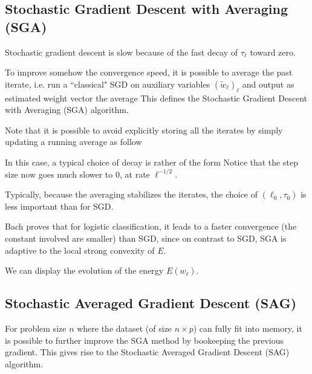 


\subsection{Stochastic Gradient Descent with Averaging (SGA)}

Stochastic gradient descent is slow because of the fast decay of
$\tau_\ell$ toward zero.

To improve somehow the convergence speed, it is possible to average the past
iterate, i.e. run a ``classical" SGD on auxiliary variables $ (\tilde w_\ell)_\ell$
and output as estimated weight vector the average
This defines the Stochastic Gradient Descent with Averaging (SGA)
algorithm.


Note that it is possible to avoid explicitly storing all the iterates by simply
updating a running average as follow


In this case, a typical choice of decay is rather of the form 
Notice that the step size now goes much slower to 0, at rate $\ell^{-1/2}$.


Typically, because the averaging stabilizes the iterates, the choice of
$(\ell_0,\tau_0)$ is less important than for SGD. 


Bach proves that for logistic classification, 
it leads to a faster convergence (the constant involved are
smaller) than SGD, since 
on contrast to SGD, SGA is adaptive to the local strong convexity of $E$.

We can display the evolution of the energy $E(w_\ell)$.




\subsection{Stochastic Averaged Gradient Descent (SAG)}

For problem size $n$ where the dataset (of size $n \times p$) can
fully fit into memory, it is possible to further improve the SGA method
by bookeeping the previous gradient. This gives rise to the 
Stochastic Averaged Gradient Descent (SAG) algorithm.


